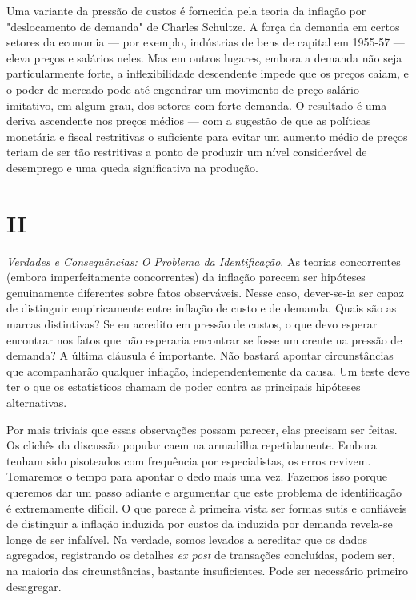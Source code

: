 \documentclass[12pt]{article}
\begin{document}
Uma variante da pressão de custos é fornecida pela teoria da inflação por "deslocamento de demanda" de Charles Schultze. A força da demanda em certos setores da economia — por exemplo, indústrias de bens de capital em 1955-57 — eleva preços e salários neles. Mas em outros lugares, embora a demanda não seja particularmente forte, a inflexibilidade descendente impede que os preços caiam, e o poder de mercado pode até engendrar um movimento de preço-salário imitativo, em algum grau, dos setores com forte demanda. O resultado é uma deriva ascendente nos preços médios — com a sugestão de que as políticas monetária e fiscal restritivas o suficiente para evitar um aumento médio de preços teriam de ser tão restritivas a ponto de produzir um nível considerável de desemprego e uma queda significativa na produção.

\section*{II}

\textit{Verdades e Consequências: O Problema da Identificação}. As teorias concorrentes (embora imperfeitamente concorrentes) da inflação parecem ser hipóteses genuinamente diferentes sobre fatos observáveis. Nesse caso, dever-se-ia ser capaz de distinguir empiricamente entre inflação de custo e de demanda. Quais são as marcas distintivas? Se eu acredito em pressão de custos, o que devo esperar encontrar nos fatos que não esperaria encontrar se fosse um crente na pressão de demanda? A última cláusula é importante. Não bastará apontar circunstâncias que acompanharão qualquer inflação, independentemente da causa. Um teste deve ter o que os estatísticos chamam de poder contra as principais hipóteses alternativas.

Por mais triviais que essas observações possam parecer, elas precisam ser feitas. Os clichês da discussão popular caem na armadilha repetidamente. Embora tenham sido pisoteados com frequência por especialistas, os erros revivem. Tomaremos o tempo para apontar o dedo mais uma vez. Fazemos isso porque queremos dar um passo adiante e argumentar que este problema de identificação é extremamente difícil. O que parece à primeira vista ser formas sutis e confiáveis de distinguir a inflação induzida por custos da induzida por demanda revela-se longe de ser infalível. Na verdade, somos levados a acreditar que os dados agregados, registrando os detalhes \textit{ex post} de transações concluídas, podem ser, na maioria das circunstâncias, bastante insuficientes. Pode ser necessário primeiro desagregar.
\end{document}

